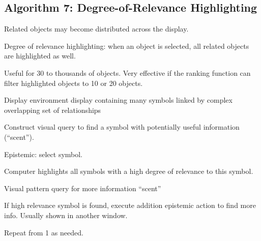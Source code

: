 \begin{mdframed}
\begin{multicols}{2}
\subsection{Algorithm 7: Degree-of-Relevance Highlighting}
\begin{compactdesc}
\item[Related objects] may become distributed across the display.
\item[Degree of relevance] highlighting: when an object is selected, all related
    objects are highlighted as well.
\item[Useful for] 30 to thousands of objects. Very effective if the ranking
    function can filter highlighted objects to 10 or 20 objects.
\item[Display environment] display containing many symbols linked by complex
    overlapping set of relationships
\end{compactdesc}

\midrule\begin{compactenum}
\item Construct visual query to find a symbol with potentially useful
    information (``scent'').
\item Epistemic: select symbol.
\item Computer highlights all symbols with a high degree of relevance to this
    symbol.
\item Visual pattern query for more information ``scent''
\item If high relevance symbol is found, execute addition epistemic action
    to find more info. Usually shown in another window.

\item Repeat from 1 as needed.
\end{compactenum}
\end{multicols}\end{mdframed}





